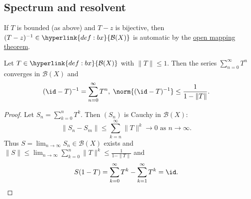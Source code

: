 \documentclass{article}
\begin{document}
\subsection{Spectrum and resolvent}

\begin{remark}
    If $T$ is bounded (as above) and $T-z$ is bijective, then $(T-z)^{-1} \in \hyperlink{def:bx}{\mathcal{B}(X)}$ is automatic by the \hyperlink{thm:omt}{open mapping theorem}.
\end{remark}

\begin{fact}
    Let $T \in \hyperlink{def:bx}{\mathcal{B}(X)}$ with $\|T\| \leq 1$.
    Then the series $\sum_{n=0}^\infty T^n$ converges in $\mathcal{B}(X)$ and
    \begin{equation*}
        (\id -T)^{-1} = \sum_{n=0}^\infty T^n, \; \norm{(\id - T)^{-1}} \leq \frac{1}{1 - \|T\|}.
    \end{equation*}
\end{fact}

\begin{proof}
    Let $S_n = \sum_{k=0}^n T^k$. Then $(S_n)$ is Cauchy in $\mathcal{B}(X)$:
    \begin{equation*}
        \|S_n - S_m\| \leq \sum_{k=n}^\infty \|T\|^k \to 0 \text{ as } n \to \infty.
    \end{equation*}
    Thus $S = \lim_{n \to \infty} S_n \in \mathcal{B}(X)$ exists and $\|S\| \leq \lim_{n \to \infty} \sum_{k=0}^n \|T\|^k \leq \frac{1}{1 - \|T\|}$ and
    \begin{equation*}
        S(1-T) = \sum_{k=0}^\infty T^k - \sum_{k=1}^\infty T^k = \id. \qedhere
    \end{equation*}
\end{proof}
\end{document}
